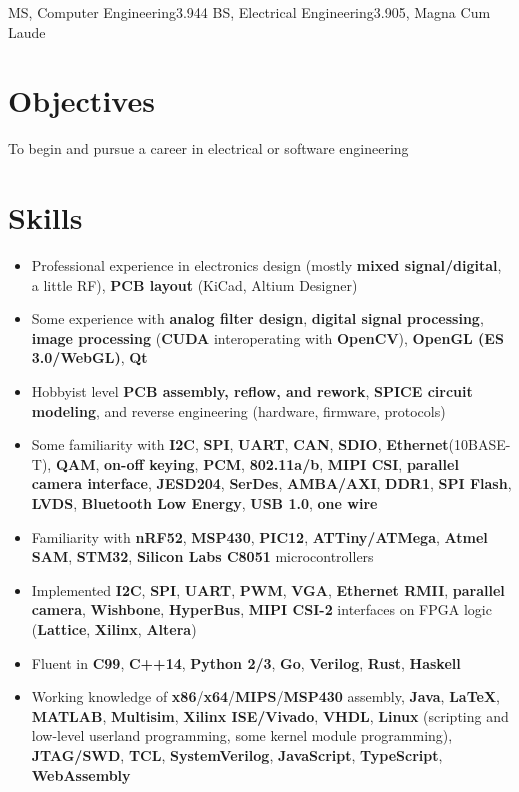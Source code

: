 \documentclass{my_resume}
\begin{document}

    {MS, Computer Engineering}{3.944}
	{BS, Electrical Engineering}{3.905, Magna Cum Laude}

\section{Objectives}
To begin and pursue a career in electrical or software engineering

\section{Skills}
\begin{itemize}[noitemsep]
    \item Professional experience in electronics design (mostly \textbf{mixed signal/digital}, a little RF), \textbf{PCB layout} (KiCad, Altium Designer)
    \item Some experience with \textbf{analog filter design}, \textbf{digital signal processing}, \textbf{image processing} (\textbf{CUDA} interoperating with \textbf{OpenCV}), \textbf{OpenGL (ES 3.0/WebGL)}, \textbf{Qt}
    \item Hobbyist level \textbf{PCB assembly, reflow, and rework}, \textbf{SPICE circuit modeling}, and reverse engineering (hardware, firmware, protocols)
    \item Some familiarity with \textbf{I2C}, \textbf{SPI}, \textbf{UART}, \textbf{CAN}, \textbf{SDIO}, \textbf{Ethernet}(10BASE-T), \textbf{QAM}, \textbf{on-off keying}, \textbf{PCM}, \textbf{802.11a/b}, \textbf{MIPI CSI}, \textbf{parallel camera interface}, \textbf{JESD204}, \textbf{SerDes}, \textbf{AMBA/AXI}, \textbf{DDR1}, \textbf{SPI Flash}, \textbf{LVDS}, \textbf{Bluetooth Low Energy}, \textbf{USB 1.0}, \textbf{one wire}
    \item Familiarity with \textbf{nRF52}, \textbf{MSP430}, \textbf{PIC12}, \textbf{ATTiny/ATMega}, \textbf{Atmel SAM}, \textbf{STM32}, \textbf{Silicon Labs C8051} microcontrollers
    \item Implemented \textbf{I2C}, \textbf{SPI}, \textbf{UART}, \textbf{PWM}, \textbf{VGA}, \textbf{Ethernet RMII}, \textbf{parallel camera}, \textbf{Wishbone}, \textbf{HyperBus}, \textbf{MIPI CSI-2} interfaces on FPGA logic (\textbf{Lattice}, \textbf{Xilinx}, \textbf{Altera})
    \item Fluent in \textbf{C99}, \textbf{C++14}, \textbf{Python 2/3}, \textbf{Go}, \textbf{Verilog}, \textbf{Rust}, \textbf{Haskell}
    \item Working knowledge of \textbf{x86}/\textbf{x64}/\textbf{MIPS}/\textbf{MSP430} assembly, \textbf{Java}, \textbf{LaTeX}, \textbf{MATLAB}, \textbf{Multisim}, \textbf{Xilinx ISE/Vivado}, \textbf{VHDL}, \textbf{Linux} (scripting and low-level userland programming, some kernel module programming), \textbf{JTAG/SWD}, \textbf{TCL}, \textbf{SystemVerilog}, \textbf{JavaScript}, \textbf{TypeScript}, \textbf{WebAssembly}
\end{itemize}
\end{document}
